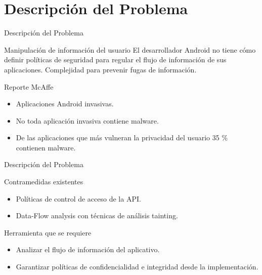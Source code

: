  \section{Descripción del Problema}
	
\begin{frame}{Descripción del Problema}
	\begin{block}{Manipulación de información del usuario}
	El desarrollador Android no tiene cómo definir políticas de seguridad para
	regular el flujo de información de sus aplicaciones.\newline
	Complejidad para prevenir fugas de información.
	\end{block}
	\pause
	\begin{block}{ Reporte McAffe}
		\begin{itemize}
	  	\item Aplicaciones Android invasivas.
	  	\item No toda aplicación invasiva contiene malware.
	  	\item De las aplicaciones que más vulneran la privacidad del usuario 35 \%
	  	contienen malware.
		\end{itemize}
	\end{block}
\end{frame}

\begin{frame}{Descripción del Problema}
	\begin{block}{Contramedidas existentes}
		\begin{itemize}
		  \item Políticas de control de acceso de la API.
		  \item Data-Flow analysis con técnicas de análisis tainting.
		\end{itemize}
	\end{block}
	\pause
	\begin{block}{Herramienta que se requiere}
		\begin{itemize}
		  \item Analizar el flujo de información del aplicativo.
		  \item Garantizar políticas de confidencialidad e integridad desde la
		  implementación.
		\end{itemize}
	\end{block}
\end{frame}